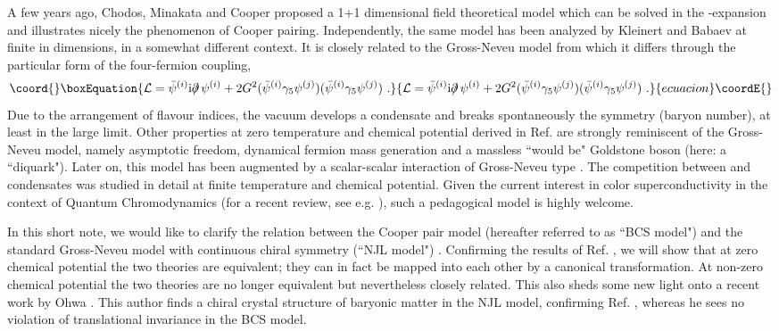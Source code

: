 \documentclass[a4paper,twocolumn,aps]{revtex4}
\begin{document}
A few years ago, Chodos, Minakata and Cooper \cite{R1} proposed a 1+1 dimensional field theoretical
model which can be solved in the \coordHE{}-expansion and illustrates nicely the phenomenon of Cooper pairing.
Independently, the same model has been analyzed by Kleinert and Babaev \cite{R1a} at finite \coordHE{} in
\coordHE{} dimensions, in a somewhat different context.
It is closely related to the Gross-Neveu model \cite{R2} from which it differs through
the particular form of the four-fermion coupling,
\begin{equation}\coord{}\boxEquation{
{\cal L} = \bar{\psi}^{(i)} {\rm i} \partial \!\!\!/ \,\psi^{(i)} +
2 G^2 (\bar{\psi}^{(i)} \gamma_5 \psi^{(j)})  (\bar{\psi}^{(i)} \gamma_5 \psi^{(j)}) \ .
\label{eq1p}
}{
{\cal L} = \bar{\psi}^{(i)} {\rm i} \partial \!\!\!/ \,\psi^{(i)} +
2 G^2 (\bar{\psi}^{(i)} \gamma_5 \psi^{(j)})  (\bar{\psi}^{(i)} \gamma_5 \psi^{(j)}) \ .
}{ecuacion}\coordE{}\end{equation}
Due to the arrangement of flavour indices, the vacuum develops a \myHighlight{$\langle \psi \psi \rangle$}\coordHE{}
condensate and breaks spontaneously the \coordHE{} symmetry (baryon number),
at least in the large \coordHE{} limit. 
Other properties
at zero temperature and chemical potential derived in Ref. \cite{R1} are strongly reminiscent of the
Gross-Neveu model, 
namely asymptotic freedom, dynamical fermion mass generation and a massless ``would be" Goldstone boson
(here: a ``diquark").
Later on, this model has been augmented by a scalar-scalar interaction of  
Gross-Neveu type \cite{R4}. The competition between \myHighlight{$\langle \bar{\psi} \psi \rangle$}\coordHE{}
and \myHighlight{$\langle \psi \psi \rangle$}\coordHE{} condensates was studied in detail at finite temperature and
chemical potential. Given the current interest in color superconductivity in
the context of Quantum Chromodynamics (for a recent review, see e.g. \cite{R5}), such a
pedagogical model is highly welcome.

In this short note, we would like to clarify the relation between the Cooper pair model \cite{R1}
(hereafter referred to as ``BCS\coordHE{} model") and the standard Gross-Neveu model with continuous chiral symmetry
(``NJL\coordHE{} model") \cite{R2,R6}. Confirming the results of Ref. \cite{R1a}, we will show that at zero
chemical potential the two theories are equivalent; they can in fact be mapped into each other
by a canonical transformation. At non-zero chemical potential the two
theories are no longer equivalent but nevertheless closely related. This also sheds
some new light onto a recent work by Ohwa \cite{R7}. This author finds a chiral crystal structure of baryonic matter
in the NJL\coordHE{} model, confirming Ref. \cite{R8}, whereas he sees no violation of translational invariance
in the BCS\coordHE{} model. 
\end{document}
